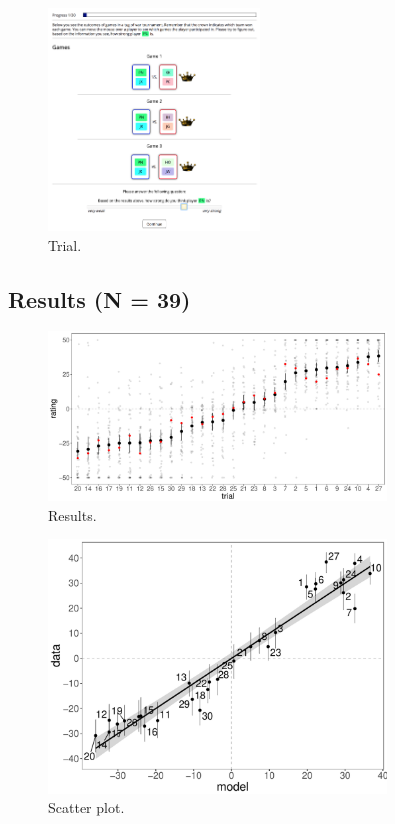 \documentclass[11pt]{article}
\begin{document}
\begin{figure}[H]
	\centering
	\includegraphics[width=0.5\textwidth]{exp1_screenshot3}
	\caption{Trial.}
	\label{fig:exp1_screenshot3}
\end{figure}

\subsection{Results (N = 39)}
\label{sub:results}


\begin{figure}[H]
  \centering
  \includegraphics[width=0.8\textwidth]{exp1_means}
  \caption{Results.}
  \label{fig:exp1_means}
\end{figure}

\begin{figure}[H]
  \centering
  \includegraphics[width=0.8\textwidth]{exp1_scatter}
  \caption{Scatter plot.}
  \label{fig:exp1_scatter}
\end{figure}
\end{document}
